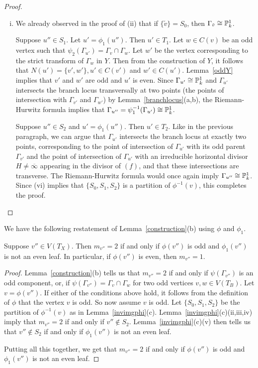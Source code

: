 \begin{proof}
\begin{enumerate}[\upshape (a)]
\begin{enumerate}[(i)]
  \item We already observed in the proof of (ii) that if $\{ \tilde{v} \} = S_0$, then $\Gamma_{\tilde{v}} \cong \mathbb P^1_k$. 
  
  Suppose $u'' \in S_1$. Let $u' = \phi_1(u'')$. Then $u' \in T_1$. Let $w \in C(v)$ be an odd vertex such that  $\psi_2(\Gamma_{u'}) = \Gamma_v \cap \Gamma_w$. Let $w'$ be the vertex corresponding to the strict transform of $\Gamma_{w}$ in $Y$. Then from the construction of $Y$, it follows that $N(u') = \{ v',w' \}, u' \in C(v')$ and $w' \in C(u')$. Lemma~\ref{oddY} implies that $v'$ and $w'$ are odd and $u'$ is even. Since $\Gamma_{u'} \cong \mathbb P^1_k$ and $\Gamma_{u'}$ intersects the branch locus transversally at two points (the points of intersection with $\Gamma_{v'}$ and $\Gamma_{w'}$) by Lemma~\ref{branchlocus}(a,b), the Riemann-Hurwitz formula implies that $\Gamma_{u''} = \psi_1^{-1}(\Gamma_{u'}) \cong \mathbb P^1_k$.
  
  Suppose $u'' \in S_2$ and $u' = \phi_1(u'')$. Then $u' \in T_2$. Like in the previous paragraph, we can argue that $\Gamma_{u'}$ intersects the branch locus at exactly two points, corresponding to the point of intersection of $\Gamma_{u'}$ with its odd parent $\Gamma_{v'}$ and the point of intersection of $\Gamma_{u'}$ with an irreducible horizontal divisor $H \neq \overline{\infty}$ appearing in the divisor of $(f)$, and that these intersections are transverse. The Riemann-Hurwitz formula would once again imply $\Gamma_{u''} \cong \mathbb P^1_k$. Since (vi) implies that $\{S_0,S_1,S_2\}$ is a partition of $\phi^{-1}(v)$, this completes the proof. \qedhere
 \end{enumerate}  
\end{enumerate} 
\end{proof}

We have the following restatement of Lemma~\ref{construction}(b) using $\phi$ and $\phi_1$.
\begin{lemma}\label{mult2}
 Suppose $v'' \in V(T_X)$. Then $m_{v''} = 2$ if and only if $\phi(v'')$ is odd and $\phi_1(v'')$ is not an even leaf. In particular, if $\phi(v'')$ is even, then $m_{v''} = 1$.
\end{lemma}
\begin{proof}
Lemma~\ref{construction}(b) tells us that $m_{v''} = 2$ if and only if $\psi(\Gamma_{v''})$ is an odd component, or, if $\psi(\Gamma_{v''}) = \Gamma_v \cap \Gamma_w$ for two odd vertices $v,w \in V(T_B)$. 
Let $v = \phi(v'')$. If either of the conditions above hold, it follows from the definition of $\phi$ that the vertex $v$ is odd. So now assume $v$ is odd. Let $\{ S_0,S_1,S_2 \}$ be the partition of $\phi^{-1}(v)$ as in Lemma~\ref{invimgphi}(c). Lemma~\ref{invimgphi}(c)(ii,iii,iv) imply that $m_{v''} = 2$ if and only if $v'' \notin S_2$. Lemma~\ref{invimgphi}(c)(v) then tells us that $v'' \notin S_2$ if and only if $\phi_1(v'')$ is not an even leaf. 

Putting all this together, we get that $m_{v''} = 2$ if and only if $\phi(v'')$ is odd and $\phi_1(v'')$ is not an even leaf.
\end{proof}

